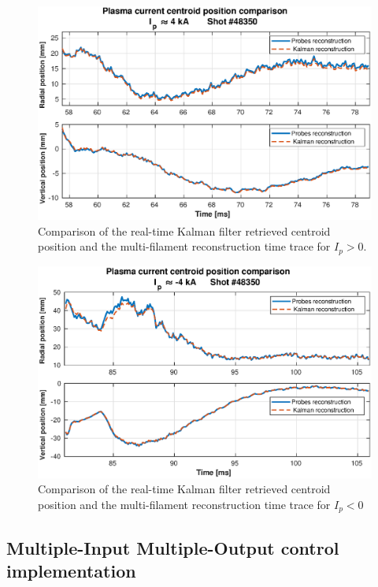 \begin{figure}[h]
	\centering
	\includegraphics[width=1.0\textwidth]{Chp5/Kalman_comp_pos.eps}
	\caption{ Comparison of the real-time Kalman filter retrieved centroid position and the multi-filament reconstruction time trace for $I_p>0$.\label{Kalman_pos}}
\end{figure}

\begin{figure}[h]
	\centering
	\includegraphics[width=1.0\textwidth]{Chp5/Kalman_comp_neg.eps}
	\caption{ Comparison of the real-time Kalman filter retrieved centroid position and the multi-filament reconstruction time trace for $I_p<0$\label{Kalman_neg}}
\end{figure}

\subsection{Multiple-Input Multiple-Output control implementation}




